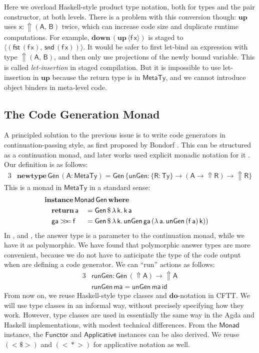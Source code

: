 \documentclass[acmsmall]{acmart}
\newcommand{\mit}[1]{{\mathsf{#1}}}
\newcommand{\msf}[1]{{\mathsf{#1}}}
\newcommand{\mbf}[1]{{\mathbf{#1}}}
\newcommand{\bs}[1]{\boldsymbol{#1}}
\newcommand{\ind}{\hspace{1em}}
\newcommand{\return}{\mbf{return}\,}
\newcommand{\lam}{\lambda\,}
\newcommand{\where}{\mbf{where}}
\newcommand{\vma}{\mathsf{ma}}
\newcommand{\vk}{\mathsf{k}}
\newcommand{\vA}{\mathsf{A}}
\newcommand{\vB}{\mathsf{B}}
\newcommand{\vR}{\mathsf{R}}
\newcommand{\va}{\mathsf{a}}
\newcommand{\vx}{\mathsf{x}}
\newcommand{\vf}{\mathsf{f}}
\newcommand{\Monad}{\msf{Monad}}
\newcommand{\Applicative}{\msf{Applicative}}
\newcommand{\Functor}{\msf{Functor}}
\newcommand{\Up}{{\Uparrow}}
\newcommand{\ql}{{\bs{\langle}}}
\newcommand{\qr}{{\bs{\rangle}}}
\newcommand{\bind}{\mathbin{>\!\!>\mkern-6.7mu=}}
\newcommand{\MTy}{\msf{MetaTy}}
\newcommand{\Ty}{\msf{Ty}}
\newcommand{\fst}{\msf{fst}}
\newcommand{\snd}{\msf{snd}}
\theoremstyle{remark}
\newcommand{\id}{\mit{id}}
\newcommand{\mup}{\mbf{up}}
\newcommand{\mdown}{\mbf{down}}
\newcommand{\instance}{\mbf{instance}\,}
\newcommand{\Gen}{\msf{Gen}}
\newcommand{\unGen}{\mit{unGen}}
\newcommand{\fmap}{<\!\!\$\!\!>}
\newcommand{\ap}{{<\!\!*\!\!>}}
\newcommand{\runGen}{\mit{runGen}}
\newcommand{\newtype}{\mbf{newtype}\,}
\newcommand{\dlr}{\,\$\,}
\begin{document}
Here we overload Haskell-style product type notation, both for types and the
pair constructor, at both levels. There is a problem with this conversion
though: $\mup$ uses $\vx : \Up(\vA,\,\vB)$ twice, which can increase code size
and duplicate runtime computations. For example, $\mdown\,({\mup\,\ql \vf\,\vx
  \qr})$ is staged to $\ql (\fst\,(\vf\,\vx),\,\snd\,(\vf\,\vx)) \qr$. It would
be safer to first let-bind an expression with type $\Up(\vA,\,\vB)$, and then
only use projections of the newly bound variable. This is called
\emph{let-insertion} in staged compilation. But it is impossible to use
let-insertion in $\mup$ because the return type is in $\MTy$, and we cannot
introduce object binders in meta-level code.

\subsection{The Code Generation Monad}\label{sec:the-code-generation-monad}

A principled solution to the previous issue is to write code generators in
continuation-passing style, as first proposed by Bondorf
\cite{DBLP:conf/lfp/Bondorf92}. This can be structured as a continuation monad,
and later works used explicit monadic notation for it
\cite{DBLP:conf/emsoft/KiselyovST04,DBLP:journals/scp/CaretteK11,DBLP:conf/pepm/SwadiTKP06}. Our
definition is as follows:
\begin{alignat*}{3}
  & \newtype \Gen\,(\vA : \MTy) = \Gen\,\{\unGen : \{\vR : \Ty\} \to (\vA \to \Up \vR) \to \Up \vR\}
\end{alignat*}
This is a monad in $\MTy$ in a standard sense:
\begin{alignat*}{3}
  &\mathrlap{\instance \Monad\,\Gen\,\where}\\
  &\ind \return \va        &&= \Gen \dlr \lam \vk.\,\vk\,\va\\
  &\ind \mit{ga} \bind \vf &&= \Gen \dlr \lam \vk.\,\unGen\,\mit{ga}\,(\lam \va.\,\unGen\,(\vf\,\va)\,\vk))
\end{alignat*}
In \cite{DBLP:conf/emsoft/KiselyovST04},\cite{DBLP:journals/scp/CaretteK11} and
\cite{DBLP:conf/pepm/SwadiTKP06}, the answer type is a parameter to the
continuation monad, while we have it as polymorphic. We have found that
polymorphic answer types are more convenient, because we do not have to
anticipate the type of the code output when are defining a code generator. We
can ``run'' actions as follows:
\begin{alignat*}{3}
  &\runGen : \Gen\,(\Up \vA) \to \Up \vA\\
  &\runGen\,\vma = \unGen\,\vma\,\id
\end{alignat*}
From now on, we reuse Haskell-style type classes and $\mbf{do}$-notation in
CFTT. We will use type classes in an informal way, without precisely specifying
how they work. However, type classes are used in essentially the same way in the
Agda and Haskell implementations, with modest technical differences.  From the
$\Monad$ instance, the $\Functor$ and $\Applicative$ instances can be also
derived. We reuse $({\fmap})$ and $({\ap})$ for applicative notation as well.
\end{document}
